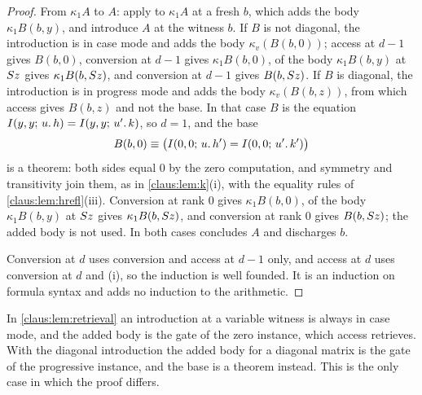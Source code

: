 \begin{proof}
From $\kappa_1A$ to $A$: apply  to $\kappa_1A$ at a fresh
$b$, which adds the body $\kappa_1B(b,y)$, and introduce $A$ at the
witness $b$. If $B$ is not diagonal, the introduction is in case mode and
adds the body $\kappa_v(B(b,0))$; access at $d-1$ gives $B(b,0)$,
conversion at $d-1$ gives $\kappa_1B(b,0)$,  of the body
$\kappa_1B(b,y)$ at $S z$ gives $\kappa_1B(b,S z)$, and conversion at
$d-1$ gives $B(b,S z)$. If $B$ is diagonal, the introduction is in
progress mode and adds the body $\kappa_v(B(b,z))$, from which access gives
$B(b,z)$ and not the base. In that case $B$ is the equation
$I(y,y;\,u.\,h)=I(y,y;\,u'.\,k)$, so $d=1$, and the base
\[
 B(b,0)\equiv
 \bigl(I(0,0;\,u.\,h')=I(0,0;\,u'.\,k')\bigr)
\]
is a theorem: both sides equal $0$ by the zero computation, and symmetry
and transitivity join them, as in \cref{claus:lem:k}(i), with the equality
rules of \cref{claus:lem:hrefl}(iii). Conversion at rank $0$ gives
$\kappa_1B(b,0)$,  of the body $\kappa_1B(b,y)$ at $S z$
gives $\kappa_1B(b,S z)$, and conversion at rank $0$ gives
$B(b,S z)$; the added body is not used. In both cases
 concludes $A$ and  discharges $b$.

Conversion at $d$ uses conversion and access at $d-1$ only, and access at
$d$ uses conversion at $d$ and (i), so the induction is well founded. It
is an induction on formula syntax and adds no induction to the arithmetic.
\end{proof}

In \cref{claus:lem:retrieval} an introduction at a variable witness is
always in case mode, and the added body is the gate of the zero instance,
which access retrieves. With the diagonal introduction the added body for a
diagonal matrix is the gate of the progressive instance, and the base is a
theorem instead. This is the only case in which the proof differs.

